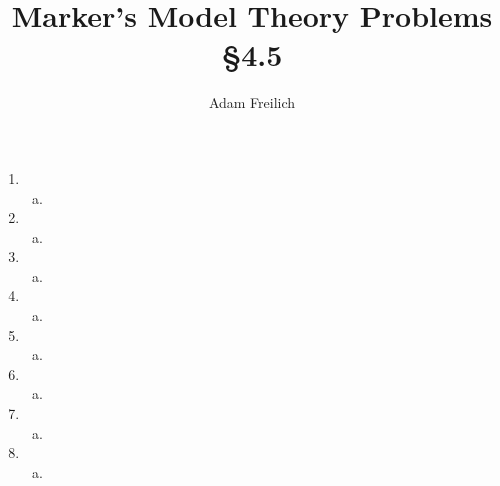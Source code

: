 \documentclass[10pt]{article}
\author{Adam Freilich}
\title{Marker's Model Theory Problems \S 4.5}
\begin{document}
\maketitle

\begin{enumerate}[1.]
\item
 
  \begin{enumerate}[a)] 
  \item 	
  \end{enumerate}

\item
 
  \begin{enumerate}[a)] 
  \item 	
  \end{enumerate}

\item
 
  \begin{enumerate}[a)] 
  \item 	
  \end{enumerate}

\item
 
  \begin{enumerate}[a)] 
  \item 	
  \end{enumerate}

\item
 
  \begin{enumerate}[a)] 
  \item 	
  \end{enumerate}

\item
 
  \begin{enumerate}[a)] 
  \item 	
  \end{enumerate}

\item
 
  \begin{enumerate}[a)] 
  \item 	
  \end{enumerate}

\item
 
  \begin{enumerate}[a)] 
  \item 	
  \end{enumerate}


\end{enumerate}
\end{document}
